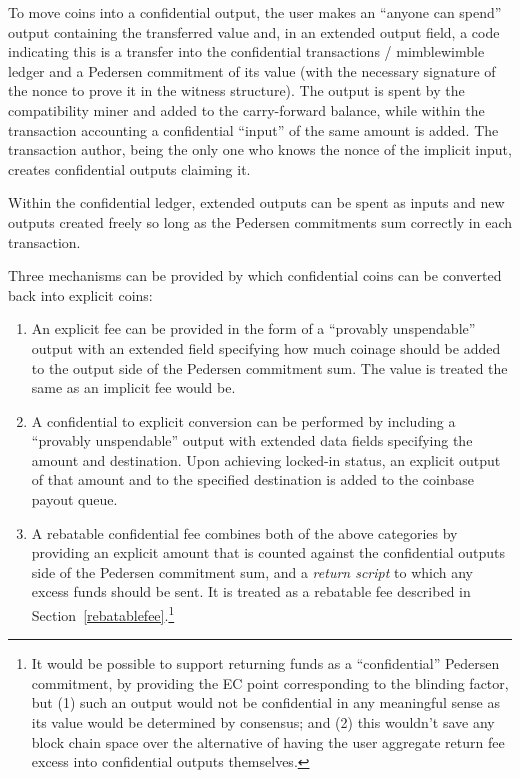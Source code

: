 To move coins into a confidential output, the user makes an ``anyone
can spend'' output containing the transferred value and, in an
extended output field, a code indicating this is a transfer into the
confidential transactions / mimblewimble ledger and a Pedersen
commitment of its value (with the necessary signature of the nonce to
prove it in the witness structure).  The output is spent by the
compatibility miner and added to the carry-forward balance, while
within the transaction accounting a confidential ``input'' of the same
amount is added.  The transaction author, being the only one who knows
the nonce of the implicit input, creates confidential outputs claiming
it.

Within the confidential ledger, extended outputs can be spent as
inputs and new outputs created freely so long as the Pedersen
commitments sum correctly in each transaction.

Three mechanisms can be provided by which confidential coins can be
converted back into explicit coins:

\begin{enumerate}

  \item

    An explicit fee can be provided in the form of a ``provably
    unspendable'' output with an extended field specifying how much
    coinage should be added to the output side of the Pedersen
    commitment sum.  The value is treated the same as an implicit fee
    would be.

  \item

    A confidential to explicit conversion can be performed by
    including a ``provably unspendable'' output with extended data
    fields specifying the amount and destination.  Upon achieving
    locked-in status, an explicit output of that amount and to the
    specified destination is added to the coinbase payout queue.

  \item

    A rebatable confidential fee combines both of the above categories
    by providing an explicit amount that is counted against the
    confidential outputs side of the Pedersen commitment sum, and a
    \emph{return script} to which any excess funds should be sent.  It
    is treated as a rebatable fee described in
    Section~\ref{rebatablefee}.\footnote{It would be possible to
      support returning funds as a ``confidential'' Pedersen
      commitment, by providing the EC point corresponding to the
      blinding factor, but (1) such an output would not be
      confidential in any meaningful sense as its value would be
      determined by consensus; and (2) this wouldn't save any block
      chain space over the alternative of having the user aggregate
      return fee excess into confidential outputs themselves.}

\end{enumerate}

